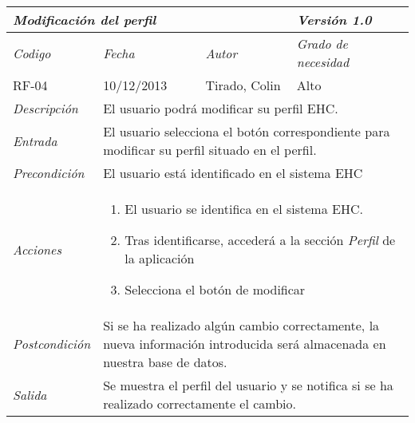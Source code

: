 \begin{tabular}{|p{3cm}|p{4cm}|p{4cm}|p{4cm}|}
\hline \multicolumn{3}{|p{9cm}|}{\textit{Modificaci\'on del perfil}} & \textit{Versi\'on 1.0} \\
\hline \textit{Codigo} & \textit{Fecha} & \textit{Autor} & \textit{Grado de necesidad} \\
RF-04 & 10/12/2013 & Tirado, Colin & Alto \\
\hline \textit{Descripci\'on} & \multicolumn{3}{|p{9cm}|}{El usuario podr\'a modificar su perfil EHC.} \\
\hline \textit{Entrada} & \multicolumn{3}{|p{9cm}|}{El usuario selecciona el bot\'on correspondiente para modificar su perfil situado en el perfil.} \\
\hline \textit{Precondici\'on} & \multicolumn{3}{|p{9cm}|}{El usuario est\'a identificado en el sistema EHC} \\
\hline \textit{Acciones} & \multicolumn{3}{|p{9cm}|}{
\begin{enumerate}
\item El usuario se identifica en el sistema EHC.
\item Tras identificarse, acceder\'a a la secci\'on \textit{Perfil} de la aplicaci\'on
\item Selecciona el bot\'on de modificar
\end{enumerate}
} \\
\hline \textit{Postcondici\'on} & \multicolumn{3}{|p{9cm}|}{Si se ha realizado alg\'un cambio correctamente, la nueva informaci\'on introducida ser\'a almacenada en nuestra base de datos.} \\
\hline \textit{Salida} & \multicolumn{3}{|p{9cm}|}{Se muestra el perfil del usuario y se notifica si se ha realizado correctamente el cambio.} \\ \hline
\end{tabular}
